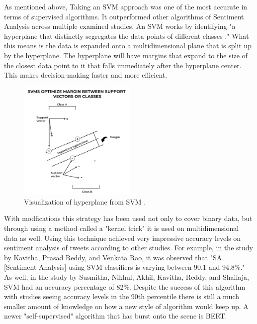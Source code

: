\documentclass[conference]{IEEEtran}
\begin{document}
As mentioned above, Taking an SVM approach was one of the most accurate in terms of supervised algorithms.
It outperformed other algorithms of Sentiment Analysis across multiple examined studies. 
An SVM works by identifying "a hyperplane that distinctly segregates the data points of different classes \cite{b6}." 
What this means is the data is expanded onto a multidimensional plane that is split up by the hyperplane. 
The hyperplane will have margins that expand to the size of the closest data point to it that falls immediately after the hyperplane center. 
This makes decision-making faster and more efficient. 
\begin{figure}[t]
    \centerline{\includegraphics[width=0.5\textwidth]{SVMVisualization.png}}
    \caption{Visualization of hyperplane from SVM \cite{b6}.}
\end{figure}
With modfications this strategy has been used not only to cover binary data, but through using a method called a "kernel trick\cite{b6}" it is used on multidimensional data as well. 
Using this technique achieved very impressive accuracy levels on sentiment analysis of tweets according to other studies.
For example, in the study by Kavitha, Prasad Reddy, and Venkata Rao, it was observed that "SA [Sentiment Analysis] using SVM classifiers is varying between 90.1 and 94.8\%\cite{11}."
As well, in the study by Susmitha, Nikhul, Akhil, Kavitha, Reddy, and Shailaja, SVM had an accuracy percentage of 82\%\cite{b5}. 
Despite the success of this algorithm with studies seeing accuracy levels in the 90th percentile there is still a much smaller amount of knowledge on how a new style of algorithm would keep up.
A newer "self-supervised\cite{b7}" algorithm that has burst onto the scene is BERT.\newline 
\end{document}
